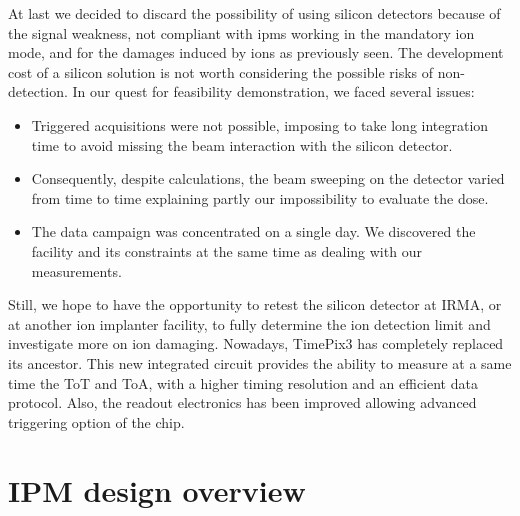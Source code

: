 \begin{refsection}
 At last we decided to discard the possibility of using silicon detectors because of the signal weakness, not compliant with \acrshort{ipm}s working in the mandatory ion mode, and for the damages induced by ions as previously seen. The development cost of a silicon solution is not worth considering the possible risks of non-detection.
  In our quest for feasibility demonstration, we faced several issues:
  \begin{itemize}
    \item Triggered acquisitions were not possible, imposing to take long integration time to avoid missing the beam interaction with the silicon detector.
    \item Consequently, despite calculations, the beam sweeping on the detector varied from time to time explaining partly our impossibility to evaluate the dose.
    \item The data campaign was concentrated on a single day. We discovered the facility and its constraints at the same time as dealing with our measurements.
  \end{itemize}

Still, we hope to have the opportunity to retest the silicon detector at IRMA, or at another ion implanter facility, to fully determine the ion detection limit and investigate more on ion damaging. 
Nowadays, TimePix3 has completely replaced its ancestor. This new integrated circuit provides the ability to measure at a same time the ToT and ToA, with a higher timing resolution and an efficient data protocol. Also, the readout electronics has been improved allowing advanced triggering option of the chip.



  \section{IPM design overview}

\end{refsection}
